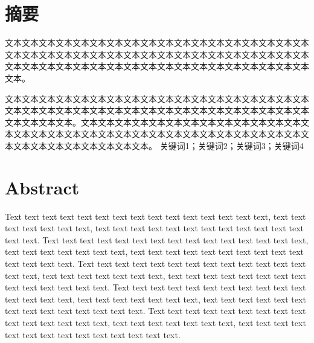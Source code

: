\documentclass[
	StudentName     = 孙敬垚,
	StudentNameEng	= {{Name of Graduate (such as HAN Bao-cheng)}},
	AdvisorName     = {{冯兴杰 教授}},
	AdvisorNameEng	= {{Name of Supervisor and Title (such as Prof. FENG Chang-gen)}},
        AdvisorNameEngSecond = {{Name of Second Supervisor and Title}},
	StudentID		= XXXXX,
	Major           = ,
	ResearchInterest= ,
	Department		= XXXX学院,
	DepartmentEng	= {{Name of Department (or School)}},
	SubmitYear		= 202X,
	SubmitMonth		= X,
	SubmitDay		= XX,
	DefenseYear		= 202X,
	DefenseMonth	= X,
	DefenseDay		= XX,
	DefenseDateEng	= {{Date of Submit (such as April 2002)}},
	Title           = I2TDM,
	TitleEng        = {{English Title}},
	CLCNumber		= TD235,
	UDCNumber		= 624.152.5
]{cauc_thesis}
\newcommand{\inputpage}[1]{
	
}
\begin{document}
\inputpage{cover}

\newpage
\setlength{\headsep}{1.224cm}
{\centering\chapter*{\heiti 摘\quad\quad 要}}
\thispagestyle{fancy}
\setcounter{page}{1}



\setlength{\baselineskip}{20pt}
    文本文本文本文本文本文本文本文本文本文本文本文本文本文本文本文本文本文本文本文本文本文本文本文本文本文本文本文本文本文本文本文本文本文本文本文本文本文本文本文本文本文本文本文本文本文本文本文本文本文本文本文本文本文本文本。
 
    文本文本文本文本文本文本文本文本文本文本文本文本文本文本文本文本文本文本文本文本文本文本文本文本文本文本文本文本文本文本文本文本文本文本文本文本文本文本文本文本。文本文本文本文本文本文本文本文本文本文本文本文本文本文本文本文本文本文本文本文本文本文本文本文本文本文本文本文本文本文本文本文本文本文本文本文本文本文本文本文本。
\newline
{} 关键词1；关键词2；关键词3；关键词4

\newpage
\setlength{\headsep}{1.224cm}
{\centering\chapter*{\textbf{Abstract}}}
\thispagestyle{fancy}
    Text text text text text text text text text text text text text text text, text text text text text text text, text text text text text text text text text text text text text text. Text text text text text text text text text text text text text text text, text text text text text text text, text text text text text text text text text text text text text text. Text text text text text text text text text text text text text text text, text text text text text text text, text text text text text text text text text text text text text text. Text text text text text text text text text text text text text text text, text text text text text text text, text text text text text text text text text text text text text text. Text text text text text text text text text text text text text text text, text text text text text text text, text text text text text text text text text text text text text text.
\end{document}
